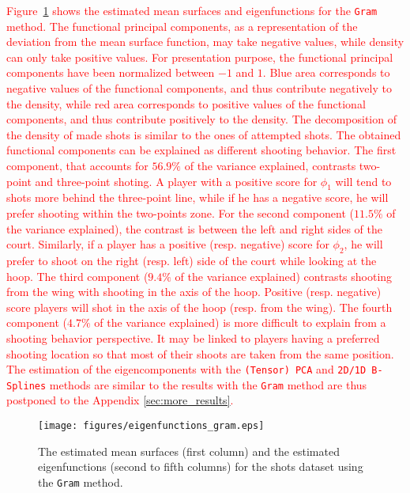 \textcolor{red}{Figure~\ref{fig:eigenfunctions_gram} shows the estimated mean surfaces and eigenfunctions for the \texttt{Gram} method. The functional principal components, as a representation of the deviation from the mean surface function, may take negative values, while density can only take positive values. For presentation purpose, the functional principal components have been normalized between $-1$ and $1$. Blue area corresponds to negative values of the functional components, and thus contribute negatively to the density, while red area corresponds to positive values of the functional components, and thus contribute positively to the density. The decomposition of the density of made shots is similar to the ones of attempted shots. The obtained functional components can be explained as different shooting behavior. The first component, that accounts for $56.9\%$ of the variance explained, contrasts two-point and three-point shoting. A player with a positive score for $\phi_1$ will tend to shots more behind the three-point line, while if he has a negative score, he will prefer shooting within the two-points zone. For the second component ($11.5\%$ of the variance explained), the contrast is between the left and right sides of the court. Similarly, if a player has a positive (resp. negative) score for $\phi_2$, he will prefer to shoot on the right (resp. left) side of the court while looking at the hoop. The third component ($9.4\%$ of the variance explained) contrasts shooting from the wing with shooting in the axis of the hoop. Positive (resp. negative) score players will shot in the axis of the hoop (resp. from the wing). The fourth component ($4.7\%$ of the variance explained) is more difficult to explain from a shooting behavior perspective. It may be linked to players having a preferred shooting location so that most of their shoots are taken from the same position. The estimation of the eigencomponents with the \texttt{(Tensor) PCA} and \texttt{2D/1D B-Splines} methods are similar to the results with the \texttt{Gram} method are thus postponed to the Appendix \ref{sec:more_results}.}
\begin{figure}
    \centering
    \texttt{[image: figures/eigenfunctions\_gram.eps]}
    \caption{The estimated mean surfaces (first column) and the estimated eigenfunctions (second to fifth columns) for the shots dataset using the \texttt{Gram} method.}
    \label{fig:eigenfunctions_gram}
\end{figure}

